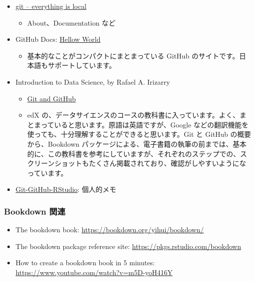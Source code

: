 \documentclass[
  xelatex, ja=standard]{bxjsbook}
\providecommand{\tightlist}{%
  \setlength{\itemsep}{0pt}\setlength{\parskip}{0pt}}
\theoremstyle{definition}
\theoremstyle{definition}
\theoremstyle{definition}
\theoremstyle{definition}
\theoremstyle{remark}
\begin{document}
\begin{itemize}
\tightlist
\item
  \href{https://git-scm.com/about}{git -- everything is local}

  \begin{itemize}
  \tightlist
  \item
    About、Documentation など
  \end{itemize}
\item
  GitHub Docs: \href{https://docs.github.com/ja/get-started/quickstart/hello-world}{Hellow World}

  \begin{itemize}
  \tightlist
  \item
    基本的なことがコンパクトにまとまっている GitHub のサイトです。日本語もサポートしています。
  \end{itemize}
\item
  Introduction to Data Science, by Rafael A. Irizarry

  \begin{itemize}
  \tightlist
  \item
    \href{http://rafalab.dfci.harvard.edu/dsbook/git.html\#git}{Git and GitHub}
  \item
    edX の、データサイエンスのコースの教科書に入っています。よく、まとまっていると思います。原語は英語ですが、Google などの翻訳機能を使っても、十分理解することができると思います。Git と GitHub の概要から、Bookdown パッケージによる、電子書籍の執筆の前までは、基本的に、この教科書を参考にしていますが、それぞれのステップでの、スクリーンショットもたくさん掲載されており、確認がしやすいようになっています。
  \end{itemize}
\item
  \href{https://icu-hsuzuki.github.io/myds/techmemo.html\#git-github-rstudio}{Git-GitHub-RStudio}: 個人的メモ
\end{itemize}

\hypertarget{bookdown-ux95a2ux9023}{%
\subsubsection{Bookdown 関連}\label{bookdown-ux95a2ux9023}}

\begin{itemize}
\item
  The bookdown book: \url{https://bookdown.org/yihui/bookdown/}
\item
  The bookdown package reference site: \url{https://pkgs.rstudio.com/bookdown}
\item
  How to create a bookdown book in 5 minutes: \url{https://www.youtube.com/watch?v=m5D-yoH416Y}
\end{itemize}
\end{document}
